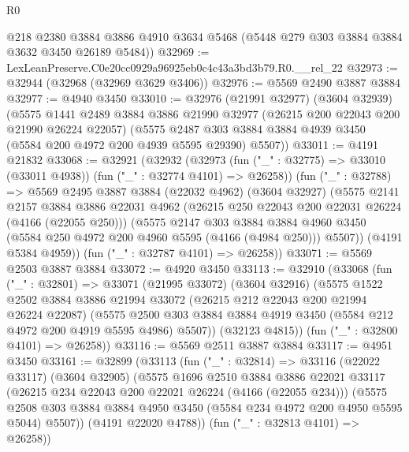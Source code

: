 \begin{lexlean}{R0}
\begin{coremodule}
      @218
      @2380
      @3884
      @3886
      @4910
      @3634
      @5468
      (@5448 @279 @303 @3884 @3884 @3632 @3450 @26189 @5484))
@32969 := LexLeanPreserve.C0e20cc0929a96925eb0c4c43a3bd3b79.R0.__rel_22
@32973 := @32944 (@32968 (@32969 @3629 @3406))
@32976 := @5569 @2490 @3887 @3884
@32977 := @4940 @3450
@33010 := @32976
    (@21991 @32977)
    (@3604 @32939)
    (@5575
      @1441
      @2489
      @3884
      @3886
      @21990
      @32977
      (@26215 @200 @22043 @200 @21990 @26224 @22057)
      (@5575 @2487 @303 @3884 @3884 @4939 @3450 (@5584 @200 @4972 @200 @4939 @5595 @29390) @5507))
@33011 := @4191 @21832
@33068 := @32921
    (@32932
      (@32973 (fun ("_" : @32775) => @33010 (@33011 @4938)) (fun ("_" : @32774 @4101) => @26258))
      (fun ("_" : @32788) =>
      @5569
        @2495
        @3887
        @3884
        (@22032 @4962)
        (@3604 @32927)
        (@5575
          @2141
          @2157
          @3884
          @3886
          @22031
          @4962
          (@26215 @250 @22043 @200 @22031 @26224 (@4166 (@22055 @250)))
          (@5575
            @2147
            @303
            @3884
            @3884
            @4960
            @3450
            (@5584 @250 @4972 @200 @4960 @5595 (@4166 (@4984 @250)))
            @5507))
        (@4191 @5384 @4959))
      (fun ("_" : @32787 @4101) => @26258))
@33071 := @5569 @2503 @3887 @3884
@33072 := @4920 @3450
@33113 := @32910
    (@33068
      (fun ("_" : @32801) =>
      @33071
        (@21995 @33072)
        (@3604 @32916)
        (@5575
          @1522
          @2502
          @3884
          @3886
          @21994
          @33072
          (@26215 @212 @22043 @200 @21994 @26224 @22087)
          (@5575
            @2500
            @303
            @3884
            @3884
            @4919
            @3450
            (@5584 @212 @4972 @200 @4919 @5595 @4986)
            @5507))
        (@32123 @4815))
      (fun ("_" : @32800 @4101) => @26258))
@33116 := @5569 @2511 @3887 @3884
@33117 := @4951 @3450
@33161 := @32899
    (@33113
      (fun ("_" : @32814) =>
      @33116
        (@22022 @33117)
        (@3604 @32905)
        (@5575
          @1696
          @2510
          @3884
          @3886
          @22021
          @33117
          (@26215 @234 @22043 @200 @22021 @26224 (@4166 (@22055 @234)))
          (@5575
            @2508
            @303
            @3884
            @3884
            @4950
            @3450
            (@5584 @234 @4972 @200 @4950 @5595 @5044)
            @5507))
        (@4191 @22020 @4788))
      (fun ("_" : @32813 @4101) => @26258))

\end{coremodule}
\end{lexlean}
